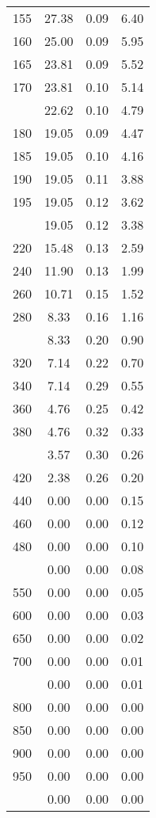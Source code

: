 \begin{table}[ht]
\begin{tabular}{lccc}
  155 & 27.38 & 0.09 & 6.40 \\ 
  160 & 25.00 & 0.09 & 5.95 \\ 
  165 & 23.81 & 0.09 & 5.52 \\ 
  170 & 23.81 & 0.10 & 5.14 \\ 
   \addlinespace
175 & 22.62 & 0.10 & 4.79 \\ 
  180 & 19.05 & 0.09 & 4.47 \\ 
  185 & 19.05 & 0.10 & 4.16 \\ 
  190 & 19.05 & 0.11 & 3.88 \\ 
  195 & 19.05 & 0.12 & 3.62 \\ 
   \addlinespace
200 & 19.05 & 0.12 & 3.38 \\ 
  220 & 15.48 & 0.13 & 2.59 \\ 
  240 & 11.90 & 0.13 & 1.99 \\ 
  260 & 10.71 & 0.15 & 1.52 \\ 
  280 & 8.33 & 0.16 & 1.16 \\ 
   \addlinespace
300 & 8.33 & 0.20 & 0.90 \\ 
  320 & 7.14 & 0.22 & 0.70 \\ 
  340 & 7.14 & 0.29 & 0.55 \\ 
  360 & 4.76 & 0.25 & 0.42 \\ 
  380 & 4.76 & 0.32 & 0.33 \\ 
   \addlinespace
400 & 3.57 & 0.30 & 0.26 \\ 
  420 & 2.38 & 0.26 & 0.20 \\ 
  440 & 0.00 & 0.00 & 0.15 \\ 
  460 & 0.00 & 0.00 & 0.12 \\ 
  480 & 0.00 & 0.00 & 0.10 \\ 
   \addlinespace
500 & 0.00 & 0.00 & 0.08 \\ 
  550 & 0.00 & 0.00 & 0.05 \\ 
  600 & 0.00 & 0.00 & 0.03 \\ 
  650 & 0.00 & 0.00 & 0.02 \\ 
  700 & 0.00 & 0.00 & 0.01 \\ 
   \addlinespace
750 & 0.00 & 0.00 & 0.01 \\ 
  800 & 0.00 & 0.00 & 0.00 \\ 
  850 & 0.00 & 0.00 & 0.00 \\ 
  900 & 0.00 & 0.00 & 0.00 \\ 
  950 & 0.00 & 0.00 & 0.00 \\ 
   \addlinespace
1000 & 0.00 & 0.00 & 0.00 \\ 
   \bottomrule
\end{tabular}
\end{table}
